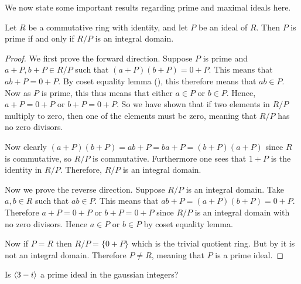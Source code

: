 We now state some important results regarding prime and maximal ideals here.
\begin{theorem}\label{thrm-prime-ideal-iff-quotient-ring-is-integral-domain}
    Let $R$ be a commutative ring with identity, and let $P$ be an ideal of $R$. Then $P$ is prime if and only if $R/P$ is an integral domain.
\end{theorem}
\begin{proof}
    We first prove the forward direction. Suppose $P$ is prime and $a+P, b+P \in R/P$ such that $(a+P)(b+P) = 0+P$. This means that $ab + P = 0 + P$. By coset equality lemma (), this therefore means that $ab \in P$. Now as $P$ is prime, this thus means that either $a \in P$ or $b \in P$. Hence, $a + P = 0 + P$ or $b + P = 0 + P$. So we have shown that if two elements in $R/P$ multiply to zero, then one of the elements must be zero, meaning that $R/P$ has no zero divisors.
    
    Now clearly $(a+P)(b+P) = ab + P = ba + P = (b+P)(a+P)$ since $R$ is commutative, so $R/P$ is commutative. Furthermore one sees that $1 + P$ is the identity in $R/P$. Therefore, $R/P$ is an integral domain.

    Now we prove the reverse direction. Suppose $R/P$ is an integral domain. Take $a,b \in R$ such that $ab \in P$. This means that $ab + P = (a+P)(b+P) = 0 + P$. Therefore $a+P = 0 + P$ or $b + P = 0 + P$ since $R/P$ is an integral domain with no zero divisors. Hence $a \in P$ or $b \in P$ by coset equality lemma.
    
    Now if $P = R$ then $R/P = \{0 + P\}$ which is the trivial quotient ring. But by  it is not an integral domain. Therefore $P \neq R$, meaning that $P$ is a prime ideal.
\end{proof}
\begin{exercise}
    Is $\left\langle3 - i\right\rangle$ a prime ideal in the gaussian integers?
\end{exercise}

